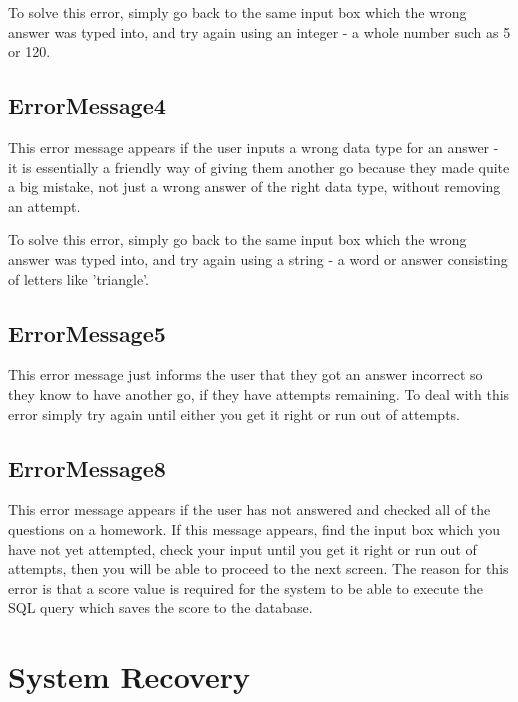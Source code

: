 
To solve this error, simply go back to the same input box which the wrong answer was typed into, and try again using an integer - a whole number such as 5 or 120.

\subsection{ErrorMessage4}

This error message appears if the user inputs a wrong data type for an answer - it is essentially a friendly way of giving them another go because they made quite a big mistake, not just a wrong answer of the right data type, without removing an attempt.


To solve this error, simply go back to the same input box which the wrong answer was typed into, and try again using a string - a word or answer consisting of letters like 'triangle'.

\subsection{ErrorMessage5}

This error message just informs the user that they got an answer incorrect so they know to have another go, if they have attempts remaining. To deal with this error simply try again until either you get it right or run out of attempts.


\subsection{ErrorMessage8}

This error message appears if the user has not answered and checked all of the questions on a homework. If this message appears, find the input box which you have not yet attempted, check your input until you get it right or run out of attempts, then you will be able to proceed to the next screen. The reason for this error is that a score value is required for the system to be able to execute the SQL query which saves the score to the database.







\section{System Recovery}


